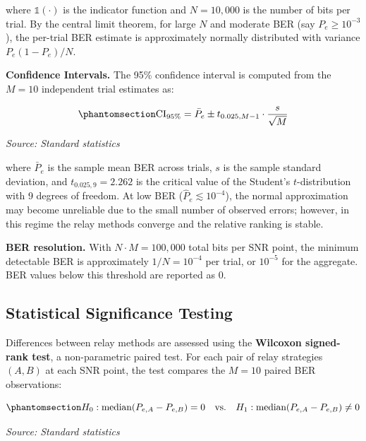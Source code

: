 where \(\mathbb{1}(\cdot)\) is the indicator function and \(N = 10{,}000\) is the number of bits per trial. By the central limit theorem, for large \(N\) and moderate BER (say \(P_e \geq 10^{-3}\)), the per-trial BER estimate is approximately normally distributed with variance \(P_e(1-P_e)/N\).

\textbf{Confidence Intervals.} The 95\% confidence interval is computed from the \(M = 10\) independent trial estimates as:

\begin{equation}\protect\phantomsection\label{eq:confidence-interval}{\text{CI}_{95\%} = \bar{P}_e \pm t_{0.025, M-1} \cdot \frac{s}{\sqrt{M}}
}\end{equation} \par{\small\textit{Source: Standard statistics}}

where \(\bar{P}_e\) is the sample mean BER across trials, \(s\) is the sample standard deviation, and \(t_{0.025, 9} = 2.262\) is the critical value of the Student's \(t\)-distribution with 9 degrees of freedom. At low BER (\(\hat{P}_e \lesssim 10^{-4}\)), the normal approximation may become unreliable due to the small number of observed errors; however, in this regime the relay methods converge and the relative ranking is stable.

\textbf{BER resolution.} With \(N \cdot M = 100{,}000\) total bits per SNR point, the minimum detectable BER is approximately \(1/N = 10^{-4}\) per trial, or \(10^{-5}\) for the aggregate. BER values below this threshold are reported as 0.

\subsection{Statistical Significance Testing}\label{sec:statistical-significance-testing}

Differences between relay methods are assessed using the \textbf{Wilcoxon signed-rank test}, a non-parametric paired test. For each pair of relay strategies \((A, B)\) at each SNR point, the test compares the \(M = 10\) paired BER observations:

\begin{equation}\protect\phantomsection\label{eq:wilcoxon-test}{H_0: \text{median}(P_{e,A} - P_{e,B}) = 0 \quad \text{vs.} \quad H_1: \text{median}(P_{e,A} - P_{e,B}) \neq 0
}\end{equation} \par{\small\textit{Source: Standard statistics}}

